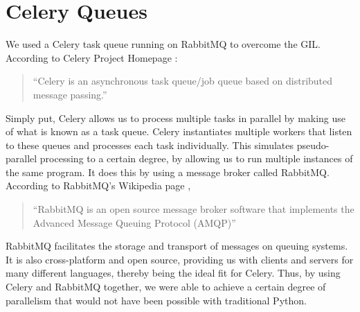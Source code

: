\section{Celery Queues}
\label{exp:Celery}
We used a Celery task queue running on RabbitMQ to overcome the GIL. According to Celery Project Homepage \cite{Celery}:
\begin{quotation}
``Celery is an asynchronous task queue/job queue based on distributed message passing.''
\end{quotation}

Simply put, Celery allows us to process multiple tasks in parallel by making use of what is known as a task queue. Celery instantiates multiple workers that listen to these queues and processes each task individually. This simulates pseudo-parallel processing to a certain degree, by allowing us to run multiple instances of the same program. It does this by using a message broker called RabbitMQ.
According to RabbitMQ's Wikipedia page \cite{wiki:RabbitMQ},
\begin{quotation}
``RabbitMQ is an open source message broker software that implements the Advanced Message Queuing Protocol (AMQP)''
\end{quotation}
RabbitMQ facilitates the storage and transport of messages on queuing systems. It is also cross-platform and open source, providing us with clients and servers for many different languages, thereby being the ideal fit for Celery.
Thus, by using Celery and RabbitMQ together, we were able to achieve a certain degree of parallelism that would not have been possible with traditional Python.

